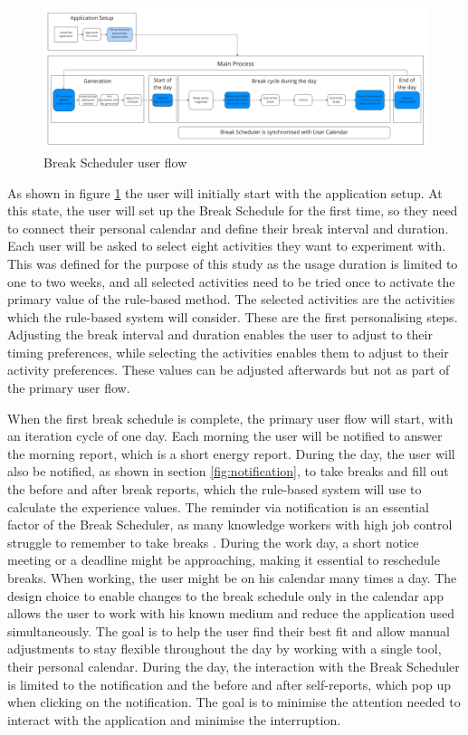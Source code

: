\documentclass{hasel_thesis}
\begin{document}
\begin{figure}[htp]
    \centering
    \includegraphics[width=15cm]{hasel_thesis/images/userflow_v2.png}
    \caption{Break Scheduler user flow}
    \label{fig:user-flow}
\end{figure}

As shown in figure \ref{fig:user-flow} the user will initially start with the application setup. At this state, the user will set up the Break Schedule for the first time, so they need to connect their personal calendar and define their break interval and duration. Each user will be asked to select eight activities they want to experiment with. This was defined for the purpose of this study as the usage duration is limited to one to two weeks, and all selected activities need to be tried once to activate the primary value of the rule-based method. The selected activities are the activities which the rule-based system will consider. These are the first personalising steps. Adjusting the break interval and duration enables the user to adjust to their timing preferences, while selecting the activities enables them to adjust to their activity preferences. These values can be adjusted afterwards but not as part of the primary user flow. 


When the first break schedule is complete, the primary user flow will start, with an iteration cycle of one day. Each morning the user will be notified to answer the morning report, which is a short energy report. During the day, the user will also be notified, as shown in section \ref{fig:notification}, to take breaks and fill out the before and after break reports, which the rule-based system will use to calculate the experience values. The reminder via notification is an essential factor of the Break Scheduler, as many knowledge workers with high job control struggle to remember to take breaks \cite{McLean.2001}. During the work day, a short notice meeting or a deadline might be approaching, making it essential to reschedule breaks. When working, the user might be on his calendar many times a day. The design choice to enable changes to the break schedule only in the calendar app allows the user to work with his known medium and reduce the application used simultaneously. The goal is to help the user find their best fit and allow manual adjustments to stay flexible throughout the day by working with a single tool, their personal calendar. During the day, the interaction with the Break Scheduler is limited to the notification and the before and after self-reports, which pop up when clicking on the notification. The goal is to minimise the attention needed to interact with the application and minimise the interruption. 
\end{document}
